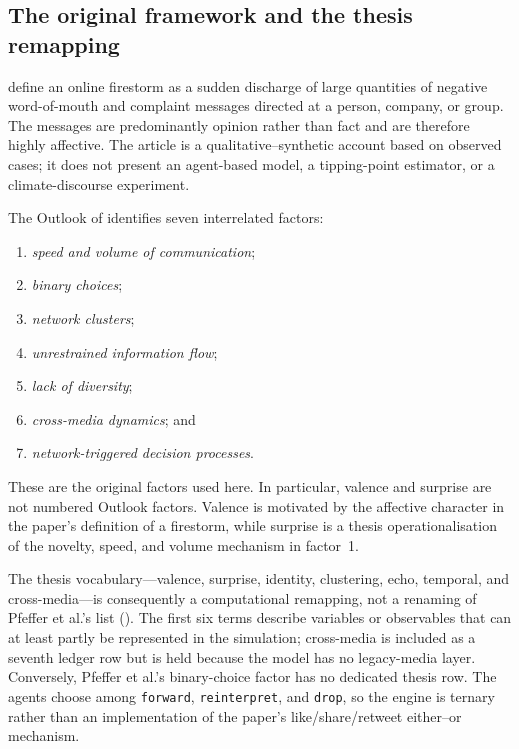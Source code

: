 \subsection{The original framework and the thesis remapping}

\Textcite{pfeffer2014firestorms} define an online firestorm as a sudden
discharge of large quantities of negative word-of-mouth and complaint
messages directed at a person, company, or group.  The messages are
predominantly opinion rather than fact and are therefore highly affective.
The article is a qualitative--synthetic account based on observed cases; it
does not present an agent-based model, a tipping-point estimator, or a
climate-discourse experiment.

The Outlook of \textcite{pfeffer2014firestorms} identifies seven
interrelated factors:
\begin{enumerate}
    \item \emph{speed and volume of communication};
    \item \emph{binary choices};
    \item \emph{network clusters};
    \item \emph{unrestrained information flow};
    \item \emph{lack of diversity};
    \item \emph{cross-media dynamics}; and
    \item \emph{network-triggered decision processes}.
\end{enumerate}
These are the original factors used here.  In particular, valence and
surprise are not numbered Outlook factors.  Valence is motivated by the
affective character in the paper's definition of a firestorm, while surprise
is a thesis operationalisation of the novelty, speed, and volume mechanism in
factor~1.

The thesis vocabulary---valence, surprise, identity, clustering, echo,
temporal, and cross-media---is consequently a computational remapping, not a
renaming of Pfeffer et al.'s list ().  The first six terms describe variables or
observables that can at least partly be represented in the simulation;
cross-media is included as a seventh ledger row but is held because the model
has no legacy-media layer.  Conversely, Pfeffer et al.'s binary-choice factor
has no dedicated thesis row.  The agents choose among
\texttt{forward}, \texttt{reinterpret}, and \texttt{drop}, so the engine is
ternary rather than an implementation of the paper's like/share/retweet
either--or mechanism.

